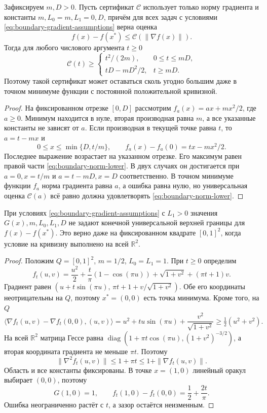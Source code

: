 \begin{proposition}
\label{prop:boundary-norm-obstruction}
Зафиксируем $m,D>0$. Пусть сертификат $\mathcal C$ использует только
норму градиента и константы $m,L_0=m,L_1=0,D$, причём для всех задач
с условиями \eqref{eq:boundary-gradient-assumptions} верна оценка
\[
 f(x)-f(x^*)\le\mathcal C(\|\nabla f(x)\|).
\]
Тогда для любого числового аргумента $t\ge0$
\begin{equation}\label{eq:boundary-norm-lower}
 \mathcal C(t)\ge
 \begin{cases}
 t^2/(2m),&0\le t\le mD,\\
 tD-mD^2/2,&t\ge mD.
 \end{cases}
\end{equation}
Поэтому такой сертификат может оставаться сколь угодно большим даже
в точном минимуме функции с постоянной положительной кривизной.
\end{proposition}
\begin{proof}
На фиксированном отрезке $[0,D]$ рассмотрим
$f_a(x)=ax+mx^2/2$, где $a\ge0$. Минимум находится в нуле, вторая
производная равна $m$, а все указанные константы не зависят от $a$.
Если производная в текущей точке равна $t$, то $a=t-mx$ и
\[
 0\le x\le\min\{D,t/m\},\qquad
 f_a(x)-f_a(0)=tx-mx^2/2.
\]
Последнее выражение возрастает на указанном отрезке. Его максимум
равен правой части \eqref{eq:boundary-norm-lower}. В двух случаях он
достигается при $a=0,x=t/m$ и $a=t-mD,x=D$ соответственно.
В точном минимуме функции $f_a$ норма градиента равна $a$, а ошибка
равна нулю, но универсальная оценка $\mathcal C(a)$ всё равно должна
удовлетворять \eqref{eq:boundary-norm-lower}.
\end{proof}

\begin{proposition}
\label{prop:boundary-gap-obstruction}
При условиях \eqref{eq:boundary-gradient-assumptions} с $L_1>0$
значения $G(x),m,L_0,L_1,D$ не задают конечной универсальной верхней
границы для $f(x)-f(x^*)$. Это верно даже на фиксированном квадрате
$[0,1]^2$, когда условие на кривизну выполнено на всей $\mathbb R^2$.
\end{proposition}
\begin{proof}
Положим $Q=[0,1]^2$, $m=1/2$, $L_0=L_1=1$. При $t\ge0$ определим
\[
 f_t(u,v)=\frac{u^2}{2}+\frac t\pi(1-\cos(\pi u))
             +\sqrt{1+v^2}+(\pi t+1)v.
\]
Градиент равен
$(u+t\sin(\pi u),\,\pi t+1+v/\sqrt{1+v^2})$.
Обе его координаты неотрицательны на $Q$, поэтому $x^*=(0,0)$ есть
точка минимума. Кроме того, на $Q$
\[
 \langle\nabla f_t(u,v)-\nabla f_t(0,0),(u,v)\rangle
 =u^2+tu\sin(\pi u)+\frac{v^2}{\sqrt{1+v^2}}
 \ge\tfrac12(u^2+v^2).
\]
На всей $\mathbb R^2$ матрица Гессе равна
$\operatorname{diag}(1+\pi t\cos(\pi u),(1+v^2)^{-3/2})$,
а вторая координата градиента не меньше $\pi t$. Поэтому
\[
 \|\nabla^2 f_t(u,v)\|\le1+\pi t
 \le1+\|\nabla f_t(u,v)\|.
\]
Область и все константы фиксированы. В точке $x=(1,0)$ линейный
оракул выбирает $(0,0)$, поэтому
\[
 G(1,0)=1,\qquad
 f_t(1,0)-f_t(0,0)=\frac12+\frac{2t}{\pi}.
\]
Ошибка неограниченно растёт с $t$, а зазор остаётся неизменным.
\end{proof}

